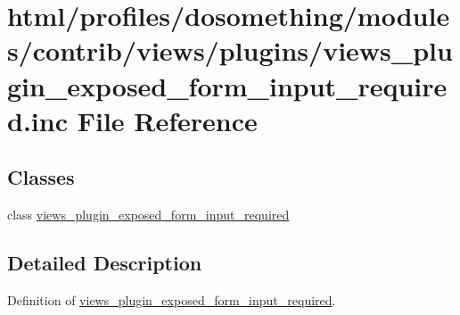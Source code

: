 \hypertarget{views__plugin__exposed__form__input__required_8inc}{
\section{html/profiles/dosomething/modules/contrib/views/plugins/views\_\-plugin\_\-exposed\_\-form\_\-input\_\-required.inc File Reference}
\label{views__plugin__exposed__form__input__required_8inc}
}
\subsection*{Classes}
\begin{DoxyCompactItemize}
\item 
class \hyperlink{classviews__plugin__exposed__form__input__required}{views\_\-plugin\_\-exposed\_\-form\_\-input\_\-required}
\end{DoxyCompactItemize}


\subsection{Detailed Description}
Definition of \hyperlink{classviews__plugin__exposed__form__input__required}{views\_\-plugin\_\-exposed\_\-form\_\-input\_\-required}. 